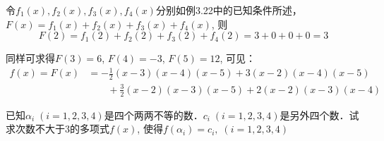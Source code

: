 \begin{solution}
  令$f_1(x),f_2(x),f_3(x),f_4(x)$分别如例3.22中的已知条件所述，$F(x)=f_1(x)+f_2(x)+f_3(x)+f_4(x)$, 则
\[    F (2) =f_1 (2) +f_2 (2) +f_3 (2) +f_4 (2) =3+0+0+0=3\]

    同样可求得$F(3)=6$, $F(4)=-3$, $F(5)=12$, 可见：
\[\begin{split}
    f(x)=F(x)&=-\frac{1}{2} (x-3) (x-4)(x-5)+3 (x-2) (x-4)(x-5)\\
    &\qquad 
    +\frac{3}{2} (x-2) (x-3)(x-5)
   +2 (x-2) (x-3)(x-4)   
\end{split}\]    
\end{solution}



\begin{example}
    已知$\alpha_i\; (i=1, 2, 3, 4)$是四个两两不等的数．$c_i\; (i=1, 2, 3, 4)$是另外四个数．试求次数不大于3的多项式$f(x)$, 使得$f (\alpha_i) =c_i,\; (i=1, 2, 3, 4)$ 
\end{example}

